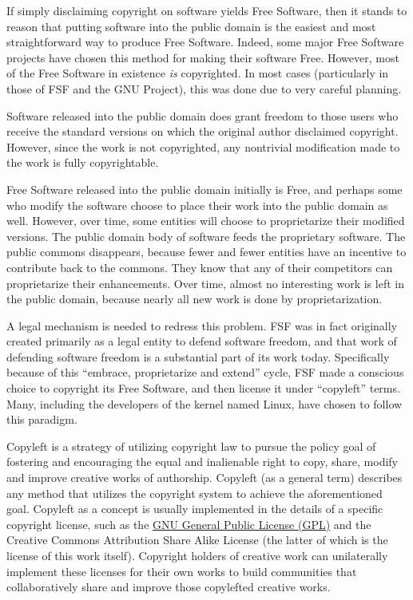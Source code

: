 If simply disclaiming copyright on software yields Free Software, then it
stands to reason that putting software into the public domain is the
easiest and most straightforward way to produce Free Software. Indeed,
some major Free Software projects have chosen this method for making their
software Free. However, most of the Free Software in existence \emph{is}
copyrighted. In most cases (particularly in those of FSF and the GNU
Project), this was done due to very careful planning.

Software released into the public domain does grant freedom to those users
who receive the standard versions on which the original author disclaimed
copyright. However, since the work is not copyrighted, any nontrivial
modification made to the work is fully copyrightable.

Free Software released into the public domain initially is Free, and
perhaps some who modify the software choose to place their work into the
public domain as well. However, over time, some entities will choose to
proprietarize their modified versions. The public domain body of software
feeds the proprietary software. The public commons disappears, because
fewer and fewer entities have an incentive to contribute back to the
commons. They know that any of their competitors can proprietarize their
enhancements. Over time, almost no interesting work is left in the public
domain, because nearly all new work is done by proprietarization.

A legal mechanism is needed to redress this problem. FSF was in fact
originally created primarily as a legal entity to defend software freedom,
and that work of defending software freedom is a substantial part of
its work today. Specifically because of this ``embrace, proprietarize and
extend'' cycle, FSF made a conscious choice to copyright its Free Software,
and then license it under ``copyleft'' terms. Many, including the
developers of the kernel named Linux, have chosen to follow this paradigm.

\label{copyleft-definition}

Copyleft is a strategy of utilizing copyright law to pursue the policy goal
of fostering and encouraging the equal and inalienable right to copy, share,
modify and improve creative works of authorship.  Copyleft (as a general
term) describes any method that utilizes the copyright system to achieve the
aforementioned goal.  Copyleft as a concept is usually implemented in the
details of a specific copyright license, such as the
\hyperref[GPLv3-full-text]{GNU General Public License (GPL)} and the Creative
Commons Attribution Share Alike License (the latter of which is the license
of this work itself).  Copyright holders of creative work can unilaterally
implement these licenses for their own works to build communities that
collaboratively share and improve those copylefted creative works.

